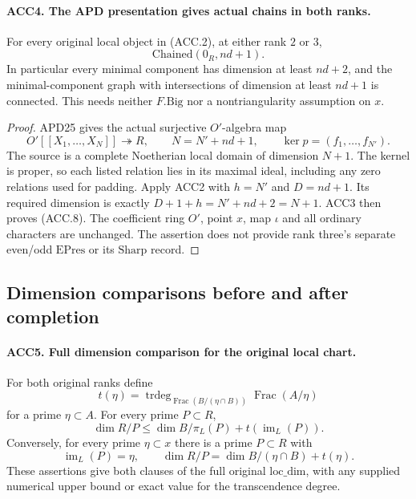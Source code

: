\paragraph{ACC4. The APD presentation gives actual chains in both ranks.}
\label{claim:ACC4}
For every original local object in (ACC.2), at either rank \(2\)
or \(3\),
\[
                  \mathrm{Chained}(0_R,nd+1).              \tag{ACC.8}
\]
In particular every minimal component has dimension at least
\(nd+2\), and the minimal-component graph with intersections of
dimension at least \(nd+1\) is connected.  This needs neither
\(F.\mathrm{Big}\) nor a nontriangularity assumption on \(x\).

\begin{proof}
APD25 gives the actual surjective \(O'\)-algebra map
\[
 O'[[X_1,\ldots,X_N]]\twoheadrightarrow R,
 \qquad N=N'+nd+1,
 \qquad \ker p=(f_1,\ldots,f_{N'}).                       \tag{ACC.9}
\]
The source is a complete Noetherian local domain of dimension
\(N+1\).  The kernel is proper, so each listed relation lies in
its maximal ideal, including any zero relations used for padding.
Apply ACC2 with \(h=N'\) and \(D=nd+1\).  Its required dimension
is exactly
\(D+1+h=N'+nd+2=N+1\).  ACC3 then proves (ACC.8).
The coefficient ring \(O'\), point \(x\), map \(\iota\) and
all ordinary characters are unchanged.  The assertion does not
provide rank three's separate even/odd \(\mathrm{EPres}\) or
its \(\mathrm{Sharp}\) record.
\end{proof}

\subsection{Dimension comparisons before and after completion}

\paragraph{ACC5. Full dimension comparison for the original local chart.}
\label{claim:ACC5}
For both original ranks define
\[
 t(\eta)=\operatorname{trdeg}_{\operatorname{Frac}(B/(\eta\cap B))}
                              \operatorname{Frac}(A/\eta)
\]
for a prime \(\eta\subset A\).  For every prime \(P\subset R\),
\[
 \dim R/P\le \dim B/\pi_L(P)+t(\operatorname{im}_L(P)).   \tag{ACC.10}
\]
Conversely, for every prime \(\eta\subset x\) there is a prime
\(P\subset R\) with
\[
 \operatorname{im}_L(P)=\eta,
 \qquad \dim R/P=\dim B/(\eta\cap B)+t(\eta).             \tag{ACC.11}
\]
These assertions give both clauses of the full original
\(\mathrm{loc\_dim}\), with any supplied numerical upper bound
or exact value for the transcendence degree.

